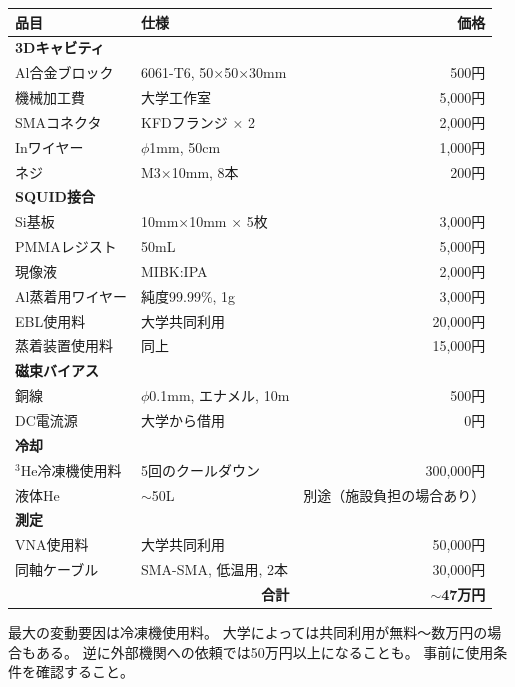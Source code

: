 \documentclass[12pt,a4paper]{article}
\begin{document}
\begin{costbox}
\begin{tabular}{llr}
\toprule
品目 & 仕様 & 価格 \\
\midrule
\multicolumn{3}{l}{\textbf{3Dキャビティ}} \\
Al合金ブロック & 6061-T6, 50×50×30mm & 500円 \\
機械加工費 & 大学工作室 & 5,000円 \\
SMAコネクタ & KFDフランジ × 2 & 2,000円 \\
Inワイヤー & $\phi$1mm, 50cm & 1,000円 \\
ネジ & M3×10mm, 8本 & 200円 \\
\midrule
\multicolumn{3}{l}{\textbf{SQUID接合}} \\
Si基板 & 10mm×10mm × 5枚 & 3,000円 \\
PMMAレジスト & 50mL & 5,000円 \\
現像液 & MIBK:IPA & 2,000円 \\
Al蒸着用ワイヤー & 純度99.99\%, 1g & 3,000円 \\
EBL使用料 & 大学共同利用 & 20,000円 \\
蒸着装置使用料 & 同上 & 15,000円 \\
\midrule
\multicolumn{3}{l}{\textbf{磁束バイアス}} \\
銅線 & $\phi$0.1mm, エナメル, 10m & 500円 \\
DC電流源 & 大学から借用 & 0円 \\
\midrule
\multicolumn{3}{l}{\textbf{冷却}} \\
$^3$He冷凍機使用料 & 5回のクールダウン & 300,000円 \\
液体He & $\sim$50L & 別途（施設負担の場合あり）\\
\midrule
\multicolumn{3}{l}{\textbf{測定}} \\
VNA使用料 & 大学共同利用 & 50,000円 \\
同軸ケーブル & SMA-SMA, 低温用, 2本 & 30,000円 \\
\midrule
\multicolumn{2}{r}{\textbf{合計}} & \textbf{$\sim$47万円} \\
\bottomrule
\end{tabular}
\end{costbox}

\begin{warnbox}
最大の変動要因は冷凍機使用料。
大学によっては共同利用が無料〜数万円の場合もある。
逆に外部機関への依頼では50万円以上になることも。
事前に使用条件を確認すること。
\end{warnbox}
\end{document}
